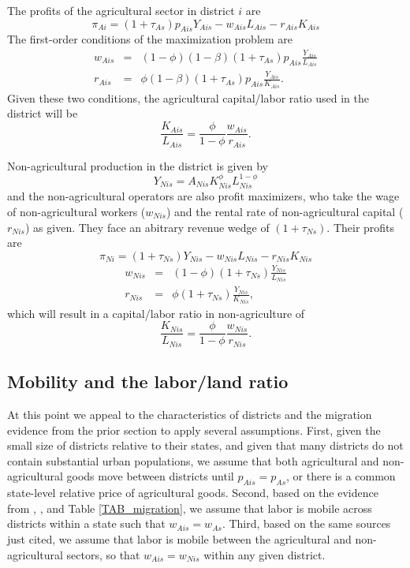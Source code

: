 \documentclass[11pt]{article}
\begin{document}
The profits of the agricultural sector in district $i$ are
\begin{equation}
	\pi_{Ai} = (1+\tau_{As}) p_{Ais} Y_{Ais} - w_{Ais} L_{Ais} - r_{Ais} K_{Ais}
\end{equation}
The first-order conditions of the maximization problem are
\begin{eqnarray}
    w_{Ais} &=& (1-\phi)(1-\beta) (1+\tau_{As}) p_{Ais} \frac{Y_{Ais}}{L_{Ais}} \\ \nonumber 
    r_{Ais} &=& \phi(1-\beta) (1+\tau_{As}) p_{Ais} \frac{Y_{Ais}}{K_{Ais}}. \label{EQ_factorprices}
\end{eqnarray}
Given these two conditions, the agricultural capital/labor ratio used in the district will be
\begin{equation}
	\frac{K_{Ais}}{L_{Ais}} = \frac{\phi}{1-\phi} \frac{w_{Ais}}{r_{Ais}}. \label{EQ_KLag}
\end{equation}

Non-agricultural production in the district is given by
\begin{equation}
	Y_{Nis} = A_{Nis} K_{Nis}^{\phi}L_{Nis}^{1-\phi} \label{EQ_nonag}
\end{equation}
and the non-agricultural operators are also profit maximizers, who take the wage of non-agricultural workers ($w_{Nis}$) and the rental rate of non-agricultural capital ($r_{Nis}$) as given. They face an abitrary revenue wedge of $(1+\tau_{Ns})$. Their profits are
\begin{equation}
	\pi_{Ni} = (1+\tau_{Ns}) Y_{Nis} - w_{Nis} L_{Nis} - r_{Nis} K_{Nis}
\end{equation}
\begin{eqnarray*}
    w_{Nis} &=& (1-\phi)(1+\tau_{Ns}) \frac{Y_{Nis}}{L_{Nis}} \\ 
    r_{Nis} &=& \phi (1+\tau_{Ns}) \frac{Y_{Nis}}{K_{Nis}},
\end{eqnarray*}
which will result in a capital/labor ratio in non-agriculture of
\begin{equation}
	\frac{K_{Nis}}{L_{Nis}} = \frac{\phi}{1-\phi} \frac{w_{Nis}}{r_{Nis}}. \label{EQ_KLnon}
\end{equation}

\subsection{Mobility and the labor/land ratio}
At this point we appeal to the characteristics of districts and the migration evidence from the prior section to apply several assumptions. First, given the small size of districts relative to their states, and given that many districts do not contain substantial urban populations, we assume that both agricultural and non-agricultural goods move between districts until $p_{Ais} = p_{As}$, or there is a common state-level relative price of agricultural goods. Second, based on the evidence from \cite{young2013inequality}, \cite{hklm2017}, and Table \ref{TAB_migration}, we assume that labor is mobile across districts within a state such that $w_{Ais} = w_{As}$. Third, based on the same sources just cited, we assume that labor is mobile between the agricultural and non-agricultural sectors, so that $w_{Ais} = w_{Nis}$ within any given district. 
\end{document}
